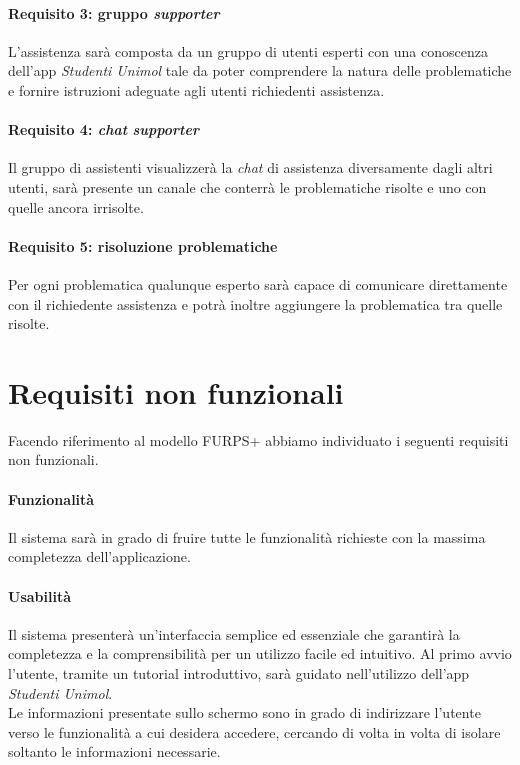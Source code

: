 \paragraph{Requisito 3: gruppo \emph{supporter}\\}
L’assistenza sarà composta da un gruppo di utenti esperti con una conoscenza dell’app \emph{Studenti Unimol} tale da poter comprendere la natura delle problematiche e fornire istruzioni adeguate agli utenti richiedenti assistenza. 

\paragraph{Requisito 4: \emph{chat} \emph{supporter}\\}
Il gruppo di assistenti visualizzerà la \emph{chat} di assistenza diversamente dagli altri utenti, sarà presente un canale che conterrà le problematiche risolte e uno con quelle ancora irrisolte.

\paragraph{Requisito 5: risoluzione problematiche\\}
Per ogni problematica qualunque esperto sarà capace di comunicare direttamente con il richiedente assistenza e potrà inoltre aggiungere la problematica tra quelle risolte. 

\section{Requisiti non funzionali}
Facendo riferimento al modello FURPS+ abbiamo individuato i seguenti requisiti
non funzionali.

\paragraph{Funzionalità\\} 
Il sistema sarà in grado di fruire tutte le funzionalità richieste con la massima completezza dell’applicazione.

\paragraph{Usabilità\\} 
Il sistema presenterà un’interfaccia semplice ed essenziale che garantirà la completezza e la comprensibilità per un utilizzo facile ed intuitivo. Al primo avvio l’utente, tramite un tutorial introduttivo, sarà guidato nell’utilizzo dell’app \emph{Studenti Unimol}.\\ 
Le informazioni presentate sullo schermo sono in grado di indirizzare l’utente verso le funzionalità a cui desidera accedere, cercando di volta in volta di isolare soltanto le informazioni necessarie.

